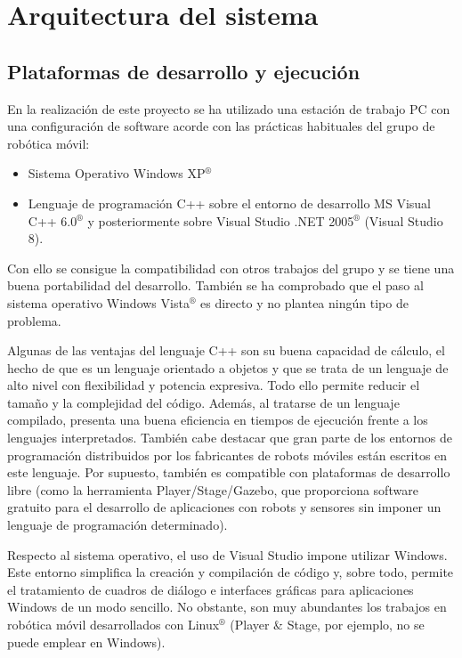 
\chapter{Arquitectura del sistema}

\section{Plataformas de desarrollo y ejecución}

En la realización de este proyecto se ha utilizado una estación de trabajo PC con una configuración de software acorde con las prácticas habituales del grupo de robótica móvil:

\begin{itemize}
  \item Sistema Operativo Windows XP$^{®}$
  \item Lenguaje de programación C++ sobre el entorno de desarrollo MS Visual C++ 6.0$^{®}$ y posteriormente sobre Visual Studio .NET 2005$^{®}$ (Visual Studio 8).
\end{itemize}

Con ello se consigue la compatibilidad con otros trabajos del grupo y se tiene una buena portabilidad del desarrollo. También se ha comprobado que el paso al sistema operativo Windows Vista$^{®}$ es directo y no plantea ningún tipo de problema.

Algunas de las ventajas del lenguaje C++ son su buena capacidad de cálculo, el hecho de que es un lenguaje orientado a objetos y que se trata de un lenguaje de alto nivel con flexibilidad y potencia expresiva. Todo ello permite reducir el tamaño y la complejidad del código. Además, al tratarse de un lenguaje compilado, presenta una buena eficiencia en tiempos de ejecución frente a los lenguajes interpretados. También cabe destacar que gran parte de los entornos de programación distribuidos por los fabricantes de robots móviles están escritos en este lenguaje. Por supuesto, también es compatible con plataformas de desarrollo libre (como la herramienta Player/Stage/Gazebo, que proporciona software gratuito para el desarrollo de aplicaciones con robots y sensores sin imponer un lenguaje de programación determinado).

Respecto al sistema operativo, el uso de Visual Studio impone utilizar Windows. Este entorno simplifica la creación y compilación de código y, sobre todo, permite el tratamiento de cuadros de diálogo e interfaces gráficas para aplicaciones Windows de un modo sencillo. No obstante, son muy abundantes los trabajos en robótica móvil desarrollados con Linux$^{®}$ (Player \& Stage, por ejemplo, no se puede emplear en Windows).

